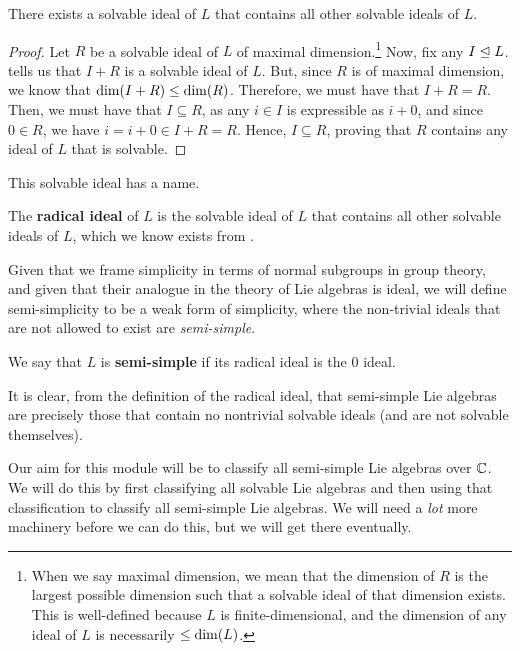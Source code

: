 \begin{boxcorollary}\label{Ch1:Cor:RadExists}
    There exists a solvable ideal of $L$ that contains all other solvable ideals of $L$.
\end{boxcorollary}
\begin{proof}
    Let $R$ be a solvable ideal of $L$ of maximal dimension.\footnote{When we say maximal dimension, we mean that the dimension of $R$ is the largest possible dimension such that a solvable ideal of that dimension exists. This is well-defined because $L$ is finite-dimensional, and the dimension of any ideal of $L$ is necessarily $\leq \dim\!\left( L \right)$.} Now, fix any $I \trianglelefteq L$.  tells us that $I + R$ is a solvable ideal of $L$. But, since $R$ is of maximal dimension, we know that $\dim\!\left( I + R \right) \leq \dim\!\left( R \right)$. Therefore, we must have that $I + R = R$. Then, we must have that $I \subseteq R$, as any $i \in I$ is expressible as $i + 0$, and since $0 \in R$, we have $i = i + 0 \in I + R = R$. Hence, $I \subseteq R$, proving that $R$ contains any ideal of $L$ that is solvable.
\end{proof}

This solvable ideal has a name.

\begin{boxdefinition}
    The \textbf{radical ideal} of $L$ is the solvable ideal of $L$ that contains all other solvable ideals of $L$, which we know exists from .
\end{boxdefinition}

Given that we frame simplicity in terms of normal subgroups in group theory, and given that their analogue in the theory of Lie algebras is ideal, we will define semi-simplicity to be a weak form of simplicity, where the non-trivial ideals that are not allowed to exist are \textit{semi-simple}.

\begin{boxdefinition}\label{Ch1:Def:SemiSimple}
    We say that $L$ is \textbf{semi-simple} if its radical ideal is the $0$ ideal.
\end{boxdefinition}

It is clear, from the definition of the radical ideal, that semi-simple Lie algebras are precisely those that contain no nontrivial solvable ideals (and are not solvable themselves).

Our aim for this module will be to classify all semi-simple Lie algebras over $\mathbb{C}$. We will do this by first classifying all solvable Lie algebras and then using that classification to classify all semi-simple Lie algebras. We will need a \textit{lot} more machinery before we can do this, but we will get there eventually.


